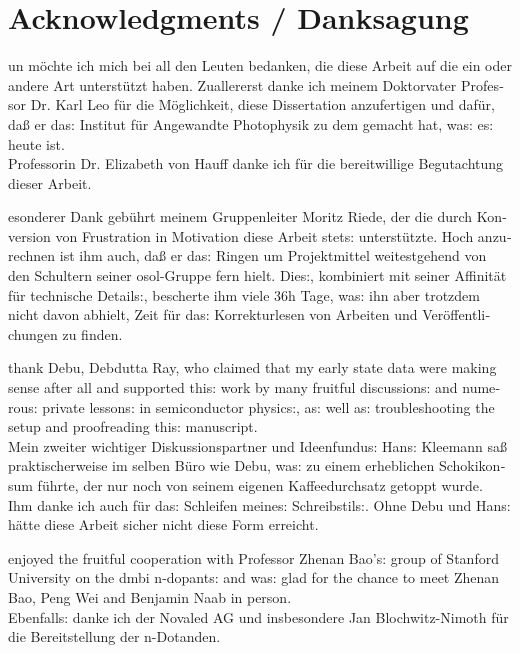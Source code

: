 \chapter*{Acknowledgments / Danksagung}
%
\begin{otherlanguage}{ngerman}
\frakfamily%
\fraklines%
%
un möchte ich mich bei all den Leuten bedanken, die diese Arbeit auf die ein oder andere Art unterstützt haben.
%
Zuallererst danke ich meinem Doktorvater Professor Dr. Karl Leo für die Möglichkeit, diese Dissertation anzufertigen und dafür, daß er das: Institut für Angewandte Photophysik zu dem gemacht hat, was: es: heute ist.\\
%
Professorin Dr. Elizabeth von Hauff danke ich für die bereitwillige Begutachtung dieser Arbeit.

esonderer Dank gebührt meinem Gruppenleiter Moritz Riede, der die durch Konversion von Frustration in Motivation diese Arbeit stets: unterstützte.
Hoch anzurechnen ist ihm auch, daß er das: Ringen um Projektmittel weitestgehend von den Schultern seiner osol-Gruppe fern hielt. Dies:, kombiniert mit seiner Affinität für technische Details:, bescherte ihm viele 36h Tage, was: ihn aber trotzdem nicht davon abhielt, Zeit für das: Korrekturlesen von Arbeiten und Veröffentlichungen zu finden.

 thank Debu, Debdutta Ray, who claimed that my early state data were making sense after all and supported this: work by many fruitful discussions: and numerous: private lessons: in semiconductor physics:, as: well as: troubleshooting the setup and proofreading this: manuscript.\\
Mein zweiter wichtiger Diskussionspartner und Ideenfundus: Hans: Kleemann saß praktischerweise im selben Büro wie Debu, was: zu einem erheblichen Schokikonsum führte, der nur noch von seinem eigenen Kaffeedurchsatz getoppt wurde. Ihm danke ich auch für das: Schleifen meines: Schreibstils:.
Ohne Debu und Hans: hätte diese Arbeit sicher nicht diese Form erreicht.

 enjoyed the fruitful cooperation with Professor Zhenan Bao's: group of Stanford University on the dmbi n-dopants: and was: glad for the chance to meet Zhenan Bao, Peng Wei and Benjamin Naab in person.\\
Ebenfalls: danke ich der Novaled AG und insbesondere Jan Blochwitz-Nimoth für die Bereitstellung der n-Dotanden.


\end{otherlanguage}
